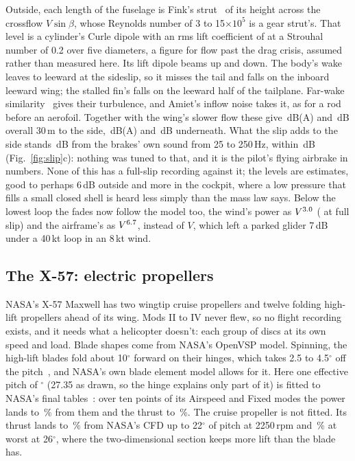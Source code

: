 \documentclass[10pt,a4paper,twocolumn]{article}
\begin{document}
Outside, each length of the fuselage is Fink's strut~\cite{anopp} of its height across the crossflow $V\sin\beta$, whose Reynolds number of 3 to 15$\times10^5$ is a gear strut's. That level is a cylinder's Curle dipole with an rms lift coefficient of \NSlLift{} at a Strouhal number of 0.2 over five diameters, a figure for flow past the drag crisis, assumed rather than measured here. Its lift dipole beams up and down. The body's wake leaves to leeward at the sideslip, so it misses the tail and falls on the inboard leeward wing; the stalled fin's falls on the leeward half of the tailplane. Far-wake similarity~\cite{wygnanski} gives their turbulence, and Amiet's inflow noise takes it, as for a rod before an aerofoil. Together with the wing's slower flow these give \NSlSide\,dB(A) and \NSlSideOA\,dB overall 30\,m to the side, \NSlBelow\,dB(A) and \NSlBelowOA\,dB underneath. What the slip adds to the side stands \NSlBrakeMean\,dB from the brakes' own sound from 25 to 250\,Hz, within \NSlBrakeSd\,dB (Fig.~\ref{fig:slip}c): nothing was tuned to that, and it is the pilot's flying airbrake in numbers. None of this has a full-slip recording against it; the levels are estimates, good to perhaps 6\,dB outside and more in the cockpit, where a low pressure that fills a small closed shell is heard less simply than the mass law says. Below the lowest loop the fades now follow the model too, the wind's power as $V^{3.0}$ (\NSlPowSlip{} at full slip) and the airframe's as $V^{6.7}$, instead of $V$, which left a parked glider 7\,dB under a 40\,kt loop in an 8\,kt wind.

\subsection{The X-57: electric propellers}\label{sec:x57}
NASA's X-57 Maxwell has two wingtip cruise propellers and twelve folding high-lift propellers ahead of its wing. Mods II to IV never flew, so no flight recording exists, and it needs what a helicopter doesn't: each group of discs at its own speed and load. Blade shapes come from NASA's OpenVSP model. Spinning, the high-lift blades fold about 10$^\circ$ forward on their hinges, which takes 2.5 to 4.5$^\circ$ off the pitch~\cite{x57tunnel}, and NASA's own blade element model allows for it. Here one effective pitch of \NXpPitch$^\circ$ (27.35 as drawn, so the hinge explains only part of it) is fitted to NASA's final tables~\cite{x57cept}: over ten points of its Airspeed and Fixed modes the power lands \NXpPowerLo{} to \NXpPowerHi\,\% from them and the thrust \NXpThrustLo{} to \NXpThrustHi\,\%. The cruise propeller is not fitted. Its thrust lands \NXpCruiseLo{} to \NXpCruiseHi\,\% from NASA's CFD up to 22$^\circ$ of pitch at 2250\,rpm and \NXpCruiseHigh\,\% at worst at 26$^\circ$, where the two-dimensional section keeps more lift than the blade has.
\end{document}
